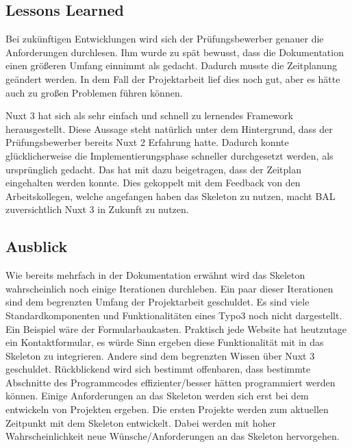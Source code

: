 \subsection{Lessons Learned}
\label{sec:LessonsLearned}

Bei zukünftigen Entwicklungen wird sich der Prüfungsbewerber genauer die Anforderungen durchlesen. Ihm wurde zu spät bewusst, dass die Dokumentation einen größeren Umfang einnimmt als gedacht. Dadurch musste die Zeitplanung geändert werden. In dem Fall der Projektarbeit lief dies noch gut, aber es hätte auch zu großen Problemen führen können.

Nuxt 3 hat sich als sehr einfach und schnell zu lernendes Framework herausgestellt. Diese Aussage steht natürlich unter dem Hintergrund, dass der Prüfungsbewerber bereits Nuxt 2 Erfahrung hatte. Dadurch konnte glücklicherweise die Implementierungsphase schneller durchgesetzt werden, als ursprünglich gedacht. Das hat mit dazu beigetragen, dass der Zeitplan eingehalten werden konnte. Dies gekoppelt mit dem Feedback von den Arbeitskollegen, welche angefangen haben das Skeleton zu nutzen, macht \acs{BAL} zuversichtlich Nuxt 3 in Zukunft zu nutzen.

\subsection{Ausblick}
\label{sec:Ausblick}

Wie bereits mehrfach in der Dokumentation erwähnt wird das Skeleton wahrscheinlich noch einige Iterationen durchleben. Ein paar dieser Iterationen sind dem begrenzten Umfang der Projektarbeit geschuldet. Es sind viele Standardkomponenten und Funktionalitäten eines Typo3 noch nicht dargestellt. Ein Beispiel wäre der Formularbaukasten. Praktisch jede Website hat heutzutage ein Kontaktformular, es würde Sinn ergeben diese Funktionalität mit in das Skeleton zu integrieren. Andere sind dem begrenzten Wissen über Nuxt 3 geschuldet. Rückblickend wird sich bestimmt offenbaren, dass bestimmte Abschnitte des Programmcodes effizienter/besser hätten programmiert werden können. Einige Anforderungen an das Skeleton werden sich erst bei dem entwickeln von Projekten ergeben. Die ersten Projekte werden zum aktuellen Zeitpunkt mit dem Skeleton entwickelt. Dabei werden mit hoher Wahrscheinlichkeit neue Wünsche/Anforderungen an das Skeleton hervorgehen.
